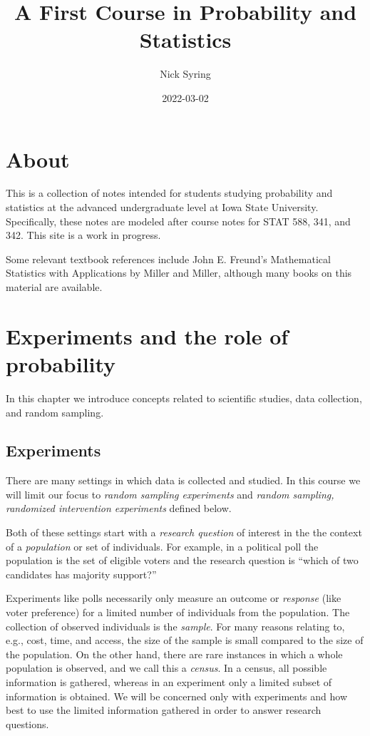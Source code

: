 \documentclass[]{book}
\title{A First Course in Probability and Statistics}
\author{Nick Syring}
\date{2022-03-02}
\begin{document}
\maketitle

{
\setcounter{tocdepth}{1}
\tableofcontents
}
\chapter{About}\label{about}

This is a collection of notes intended for students studying probability
and statistics at the advanced undergraduate level at Iowa State
University. Specifically, these notes are modeled after course notes for
STAT 588, 341, and 342. This site is a work in progress.

Some relevant textbook references include John E. Freund's Mathematical
Statistics with Applications by Miller and Miller, although many books
on this material are available.

\chapter{Experiments and the role of
probability}\label{experiments-and-the-role-of-probability}

In this chapter we introduce concepts related to scientific studies,
data collection, and random sampling.

\section{Experiments}\label{experiments}

There are many settings in which data is collected and studied. In this
course we will limit our focus to \emph{random sampling experiments} and
\emph{random sampling, randomized intervention experiments} defined
below.

Both of these settings start with a \emph{research question} of interest
in the the context of a \emph{population} or set of individuals. For
example, in a political poll the population is the set of eligible
voters and the research question is ``which of two candidates has
majority support?''

Experiments like polls necessarily only measure an outcome or
\emph{response} (like voter preference) for a limited number of
individuals from the population. The collection of observed individuals
is the \emph{sample}. For many reasons relating to, e.g., cost, time,
and access, the size of the sample is small compared to the size of the
population. On the other hand, there are rare instances in which a whole
population is observed, and we call this a \emph{census}. In a census,
all possible information is gathered, whereas in an experiment only a
limited subset of information is obtained. We will be concerned only
with experiments and how best to use the limited information gathered in
order to answer research questions.
\end{document}
